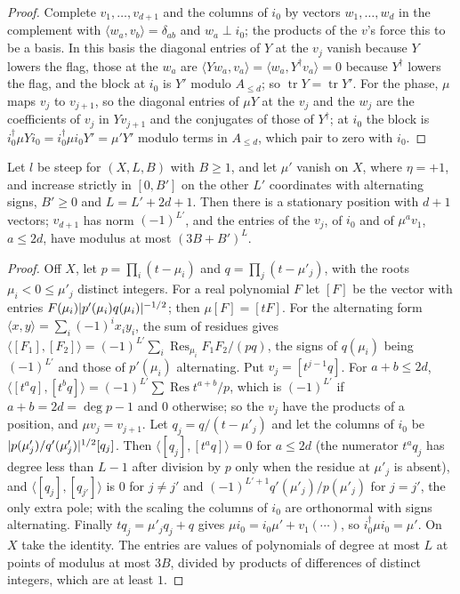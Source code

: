 \begin{proof}
Complete $v_1,\dots,v_{d+1}$ and the columns of $i_0$ by vectors $w_1,\dots,w_d$ in the complement with $\langle w_a,v_b\rangle=\delta_{ab}$ and $w_a\perp i_0$; the products of the $v$'s force this to be a basis. In this basis the diagonal entries of $Y$ at the $v_j$ vanish because $Y$
lowers the flag, those at the $w_a$ are $\langle Yw_a,v_a\rangle=\langle w_a,Y^\dagger v_a\rangle=0$ because $Y^\dagger$ lowers the flag, and the block at $i_0$ is $Y'$ modulo $A_{\le d}$; so $\operatorname{tr}Y=\operatorname{tr}Y'$. For the phase, $\mu$ maps $v_j$ to $v_{j+1}$, so the diagonal entries of $\mu Y$ at the
$v_j$ and the $w_j$ are the coefficients of $v_j$ in $Yv_{j+1}$ and the conjugates of those of $Y^\dagger$; at $i_0$ the block is $i_0^\dagger\mu Yi_0=i_0^\dagger\mu i_0Y'=\mu'Y'$ modulo terms in $A_{\le d}$, which pair to zero with $i_0$.
\end{proof}

\begin{proposition}\label{prop:A-stationary}
Let $l$ be steep for $(X,L,B)$ with $B\ge1$, and let $\mu'$ vanish on $X$, where $\eta=+1$, and increase strictly in $[0,B']$ on the other $L'$ coordinates with alternating signs, $B'\ge0$ and $L=L'+2d+1$. Then there is a stationary
position with $d+1$ vectors; $v_{d+1}$ has norm $(-1)^{L'}$, and the entries of the $v_j$, of $i_0$ and of $\mu^av_1$, $a\le2d$, have modulus at most $(3B+B')^L$.
\end{proposition}

\begin{proof}
Off $X$, let $p=\prod_i(t-\mu_i)$ and $q=\prod_j(t-\mu'_j)$, with the roots $\mu_i<0\le\mu'_j$ distinct integers. For a real polynomial $F$ let $[F]$ be the vector with entries $F(\mu_i)\lvert p'(\mu_i)q(\mu_i)\rvert^{-1/2}$; then $\mu[F]=[tF]$. For the alternating
form $\langle x,y\rangle=\sum_i(-1)^ix_iy_i$, the sum of residues gives $\langle[F_1],[F_2]\rangle=(-1)^{L'}\sum_i\operatorname{Res}_{\mu_i}F_1F_2/(pq)$, the signs of $q(\mu_i)$ being $(-1)^{L'}$ and those of $p'(\mu_i)$ alternating. Put $v_j=[t^{j-1}q]$. For $a+b\le2d$,
$\langle[t^aq],[t^bq]\rangle=(-1)^{L'}\sum\operatorname{Res}t^{a+b}/p$, which is $(-1)^{L'}$ if $a+b=2d=\deg p-1$ and $0$ otherwise; so the $v_j$ have the products of a position, and $\mu v_j=v_{j+1}$. Let $q_j=q/(t-\mu'_j)$ and let the columns of $i_0$ be
$\lvert p(\mu'_j)/q'(\mu'_j)\rvert^{1/2}[q_j]$. Then $\langle[q_j],[t^aq]\rangle=0$ for $a\le2d$ (the numerator $t^aq_j$ has degree less than $L-1$ after division by $p$ only when the residue at $\mu'_j$ is absent), and $\langle[q_j],[q_{j'}]\rangle$ is $0$ for $j\ne j'$ and
$(-1)^{L'+1}q'(\mu'_j)/p(\mu'_j)$ for $j=j'$, the only extra pole; with the scaling the columns of $i_0$ are orthonormal with signs alternating. Finally $t q_j=\mu'_jq_j+q$ gives $\mu i_0=i_0\mu'+v_1(\cdots)$, so $i_0^\dagger\mu i_0=\mu'$. On $X$ take the identity.
The entries are values of polynomials of degree at most $L$ at points of modulus at most $3B$, divided by products of differences of distinct integers, which are at least $1$.
\end{proof}

